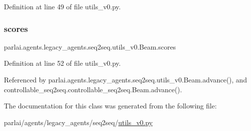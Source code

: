 Definition at line 49 of file utils\+\_\+v0.\+py.

\mbox{\label{classparlai_1_1agents_1_1legacy__agents_1_1seq2seq_1_1utils__v0_1_1Beam_a6f0cb3d9a944a1c1bab850834d81b798}} 
\subsubsection{\texorpdfstring{scores}{scores}}
{\footnotesize\ttfamily parlai.\+agents.\+legacy\+\_\+agents.\+seq2seq.\+utils\+\_\+v0.\+Beam.\+scores}



Definition at line 52 of file utils\+\_\+v0.\+py.



Referenced by parlai.\+agents.\+legacy\+\_\+agents.\+seq2seq.\+utils\+\_\+v0.\+Beam.\+advance(), and controllable\+\_\+seq2seq.\+controllable\+\_\+seq2seq.\+Beam.\+advance().



The documentation for this class was generated from the following file\+:\begin{DoxyCompactItemize}
\item 
parlai/agents/legacy\+\_\+agents/seq2seq/\hyperlink{utils__v0_8py}{utils\+\_\+v0.\+py}\end{DoxyCompactItemize}
